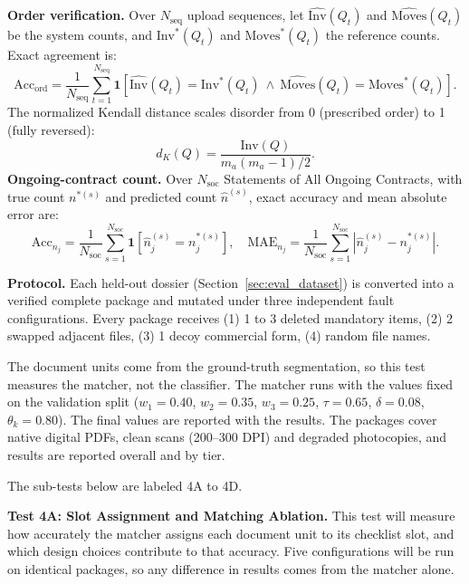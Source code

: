 \textbf{Order verification.} Over $N_{\mathrm{seq}}$ upload sequences, let $\widehat{\mathrm{Inv}}(Q_t)$ and $\widehat{\mathrm{Moves}}(Q_t)$ be the system counts, and $\mathrm{Inv}^*(Q_t)$ and $\mathrm{Moves}^*(Q_t)$ the reference counts. Exact agreement is:
\begin{equation}
\label{eq:order_accuracy}
\mathrm{Acc}_{\mathrm{ord}}=\frac{1}{N_{\mathrm{seq}}}\sum_{t=1}^{N_{\mathrm{seq}}}
\mathbf1\!\left[\widehat{\mathrm{Inv}}(Q_t)=\mathrm{Inv}^*(Q_t)\ \land\
\widehat{\mathrm{Moves}}(Q_t)=\mathrm{Moves}^*(Q_t)\right].
\end{equation}
The normalized Kendall distance scales disorder from 0 (prescribed order) to 1 (fully reversed):
\begin{equation}
\label{eq:kendall_distance}
d_K(Q)=\frac{\mathrm{Inv}(Q)}{m_a(m_a-1)/2}.
\end{equation}
\textbf{Ongoing-contract count.} Over $N_{\mathrm{soc}}$ Statements of All Ongoing Contracts, with true count $n^{*(s)}$ and predicted count $\hat n^{(s)}$, exact accuracy and mean absolute error are:
\begin{equation}
\label{eq:contract_count_metrics}
\mathrm{Acc}_{n_j}=\frac{1}{N_{\mathrm{soc}}}\sum_{s=1}^{N_{\mathrm{soc}}}\mathbf1[\hat n_j^{(s)}=n_j^{*(s)}],
\quad
\mathrm{MAE}_{n_j}=\frac{1}{N_{\mathrm{soc}}}\sum_{s=1}^{N_{\mathrm{soc}}}|\hat n_j^{(s)}-n_j^{*(s)}|.
\end{equation}

\textbf{Protocol.} Each held-out dossier (Section~\ref{sec:eval_dataset}) is converted into a verified complete package and mutated under three independent fault configurations. Every package receives (1) 1 to 3 deleted mandatory items, (2) 2 swapped adjacent files, (3) 1 decoy commercial form, (4) random file names.

The document units come from the ground-truth segmentation, so this test measures the matcher, not the classifier. The matcher runs with the values fixed on the validation split ($w_1=0.40$, $w_2=0.35$, $w_3=0.25$, $\tau=0.65$, $\delta=0.08$, $\theta_k=0.80$). The final values are reported with the results. The packages cover native digital PDFs, clean scans (200--300 DPI) and degraded photocopies, and results are reported overall and by tier.

The sub-tests below are labeled 4A to 4D.

\textbf{Test 4A: Slot Assignment and Matching Ablation.} This test will measure how accurately the matcher assigns each document unit to its checklist slot, and which design choices contribute to that accuracy. Five configurations will be run on identical packages, so any difference in results comes from the matcher alone.

